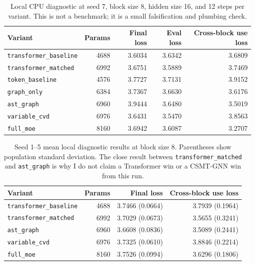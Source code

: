 \documentclass[10pt]{article}
\begin{document}
\begin{table}[t]
  \centering
  \caption{Local CPU diagnostic at seed 7, block size 8, hidden size 16, and 12
  steps per variant.  This is not a benchmark; it is a small falsification and
  plumbing check.}
  \label{tab:local_diag_main}
  \small
  \begin{tabular}{lrrrr}
    \toprule
    Variant & Params & Final loss & Eval loss & Cross-block use loss \\
    \midrule
    \texttt{transformer\_baseline} & 4688 & 3.6034 & 3.6342 & 3.6809 \\
    \texttt{transformer\_matched} & 6992 & 3.6751 & 3.5889 & 3.7469 \\
    \texttt{token\_baseline} & 4576 & 3.7727 & 3.7131 & 3.9152 \\
    \texttt{graph\_only} & 6384 & 3.7367 & 3.6630 & 3.6176 \\
    \texttt{ast\_graph} & 6960 & 3.9444 & 3.6480 & 3.5019 \\
    \texttt{variable\_cvd} & 6976 & 3.6431 & 3.5470 & 3.8563 \\
    \texttt{full\_moe} & 8160 & 3.6942 & 3.6087 & 3.2707 \\
    \bottomrule
  \end{tabular}
\end{table}

\begin{table}[t]
  \centering
  \caption{Seed 1--5 mean local diagnostic results at block size 8.  Parentheses
  show population standard deviation.  The close result between
  \texttt{transformer\_matched} and \texttt{ast\_graph} is why I do not claim a
  Transformer win or a CSMT-GNN win from this run.}
  \label{tab:local_diag_seeds}
  \small
  \begin{tabular}{lrrr}
    \toprule
    Variant & Params & Final loss & Cross-block use loss \\
    \midrule
    \texttt{transformer\_baseline} & 4688 & 3.7466 (0.0664) & 3.7939 (0.1964) \\
    \texttt{transformer\_matched} & 6992 & 3.7029 (0.0673) & 3.5655 (0.3241) \\
    \texttt{ast\_graph} & 6960 & 3.6608 (0.0836) & 3.5089 (0.2441) \\
    \texttt{variable\_cvd} & 6976 & 3.7325 (0.0610) & 3.8846 (0.2214) \\
    \texttt{full\_moe} & 8160 & 3.7526 (0.0994) & 3.6296 (0.1806) \\
    \bottomrule
  \end{tabular}
\end{table}
\end{document}
